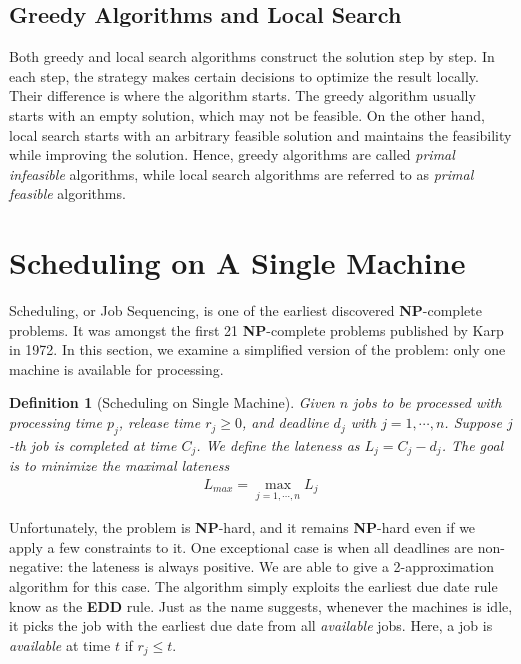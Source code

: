 \documentclass[11pt,psfig,times]{article}
\newcommand*{\NP}{\textbf{NP}}
\newtheorem{definition}[theorem]{Definition}
\begin{document}
\subsection{Greedy Algorithms and Local Search}
Both greedy and local search algorithms construct the solution step by step. 
In each step, the strategy makes certain decisions to optimize the result locally. 
Their difference is where the algorithm starts. 
The greedy algorithm usually starts with an empty solution, which may not be feasible. 
On the other hand, local search starts with an arbitrary feasible solution
and maintains the feasibility while improving the solution. 
Hence, greedy algorithms are called \textit{primal infeasible} algorithms, while local search algorithms 
are referred to as \textit{primal feasible} algorithms.


\section{Scheduling on A Single Machine}
Scheduling, or Job Sequencing, is one of the earliest discovered \textbf{NP}-complete problems. 
It was amongst the first 21 \textbf{NP}-complete problems published by Karp in 1972. In this section, 
we examine a simplified version of the problem: only one machine is available for processing.
\begin{definition}[Scheduling on Single Machine]
    Given $n$ jobs to be processed with processing time $p_j$, release time $r_j \geq 0$, and deadline $d_j$ with $j = 1, \cdots, n$.
    Suppose $j$-th job is completed at time $C_j$. We define the lateness as $L_j = C_j - d_j$. The goal is to minimize the maximal lateness 
    \begin{align*}
        L_{max} = \max_{j = 1, \cdots, n} L_j
    \end{align*}
\end{definition} 
Unfortunately, the problem is \NP-hard, and it remains \NP-hard even if we apply 
a few constraints to it. One exceptional case is when all deadlines are non-negative: the lateness is always positive. 
We are able to give a 2-approximation algorithm for this case. The algorithm simply exploits the earliest due date rule know as the \textbf{EDD} rule. 
Just as the name suggests, whenever the machines is idle, it picks the job with the earliest due date from all \textit{available} jobs.
Here, a job is \textit{available} at time $t$ if $r_j \leq t$.
\end{document}
